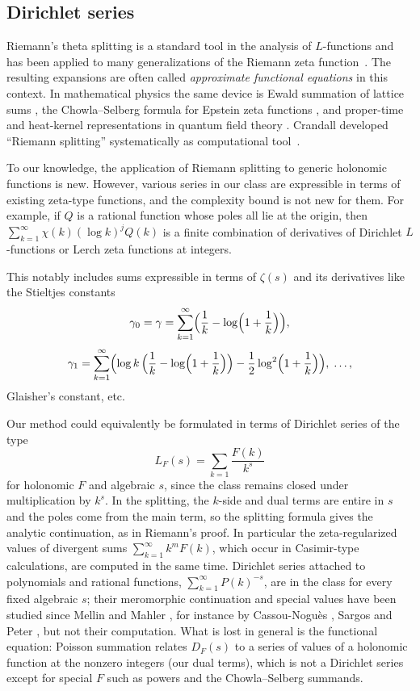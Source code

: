 \documentclass[11pt,reqno]{amsart}
\theoremstyle{definition}
\theoremstyle{remark}
\begin{document}
\subsection{Dirichlet series}\label{sec:zetatheta}

Riemann's theta splitting is a standard tool in the analysis
of $L$-functions and has been applied to many generalizations
of the Riemann zeta function~\cite{Lav68,CN62,Rub05,Dok04,GLS03}.
The resulting expansions are often called \emph{approximate functional equations}
in this context.
In mathematical physics the same device is Ewald summation of lattice sums
\cite{Ewa21}, the Chowla--Selberg formula for Epstein zeta functions \cite{CS67,BGMWZ13},
and proper-time and heat-kernel representations in quantum field theory
\cite{Sch51,Eli95,Kir02}. Crandall developed ``Riemann splitting''
systematically as computational tool~\cite{BBC00,Cra12}.

To our knowledge, the application of Riemann splitting
to generic holonomic functions is new.
However, various series in our class are expressible in terms of existing zeta-type functions,
and the complexity bound is not new for them.
For example, if $Q$ is a rational function whose poles all lie
at the origin, then $\sum_{k=1}^{\infty} \chi(k)(\log k)^j Q(k)$ is a finite combination of derivatives of Dirichlet $L$-functions
or Lerch zeta functions at integers.

This notably includes sums expressible in terms of $\zeta(s)$ and
its derivatives like the Stieltjes constants
\[
  \gamma_0 = \gamma = \sum_{k=1}^{\infty}\Bigl(\frac1k - \log\Bigl(1+\frac1k\Bigr)\Bigr),
\]
\[
  \gamma_1 = \sum_{k=1}^{\infty}\Bigl(\log k\,\Bigl(\frac1k - \log\Bigl(1+\frac1k\Bigr)\Bigr)
    - \frac12\log^2\Bigl(1+\frac1k\Bigr)\Bigr), \; \ldots,
\]
Glaisher's constant, etc.

Our method could equivalently be formulated in terms of
Dirichlet series of the type
\[
L_F(s) = \sum_{k=1} \frac{F(k)}{k^s}
\]
for holonomic $F$ and algebraic $s$, since the class remains closed
under multiplication by $k^s$.
In the splitting, the $k$-side and dual terms are entire in $s$ and the poles come from the main term, so the splitting
formula gives the analytic continuation, as in Riemann's proof. In particular the zeta-regularized values of divergent
sums $\sum_{k=1}^{\infty} k^mF(k)$, which occur in Casimir-type calculations, are computed in the same time. Dirichlet series
attached to polynomials and rational functions, $\sum_{k=1}^{\infty} P(k)^{-s}$, are in the class for every fixed algebraic $s$;
their meromorphic continuation and special values have been studied since Mellin and Mahler \cite{Mah28}, for instance
by Cassou-Nogu\`es \cite{CN81}, Sargos \cite{Sar84} and Peter \cite{Pet98}, but not their computation. What is lost in
general is the functional equation: Poisson summation relates $D_F(s)$ to a series of values of a holonomic function
at the nonzero integers (our dual terms), which is not a Dirichlet series except for special $F$ such as powers
and the Chowla--Selberg summands.
\end{document}
